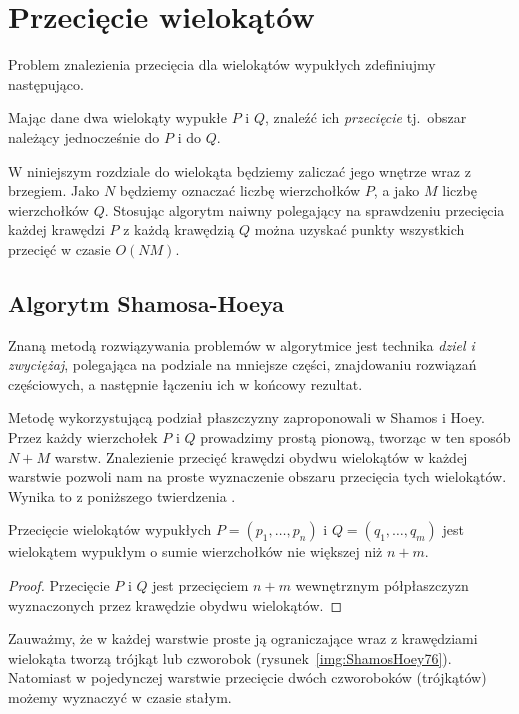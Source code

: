 \chapter{Przecięcie wielokątów}
Problem znalezienia przecięcia dla wielokątów wypukłych zdefiniujmy
następująco.

\begin{problem}
  Mając dane dwa wielokąty wypukłe $P$ i $Q$, znaleźć ich
  \emph{przecięcie} tj.\ obszar należący jednocześnie do $P$ i do $Q$.
\end{problem}

W niniejszym rozdziale do wielokąta będziemy zaliczać jego wnętrze
wraz z brzegiem. Jako $N$ będziemy oznaczać liczbę wierzchołków $P$, a
jako $M$ liczbę wierzchołków $Q$. Stosując algorytm naiwny polegający
na sprawdzeniu przecięcia każdej krawędzi $P$ z każdą krawędzią $Q$
można uzyskać punkty wszystkich przecięć w czasie $O(NM)$.

\section{Algorytm Shamosa-Hoeya}
Znaną metodą rozwiązywania problemów w algorytmice jest technika
\emph{dziel i zwyciężaj}, polegająca na podziale na mniejsze części,
znajdowaniu rozwiązań częściowych, a następnie łączeniu ich w końcowy
rezultat.

Metodę wykorzystującą podział płaszczyzny zaproponowali w
\cite{ShamosHoey76} Shamos i Hoey. Przez każdy wierzchołek $P$ i $Q$
prowadzimy prostą pionową, tworząc w ten sposób $N+M$
warstw. Znalezienie przecięć krawędzi obydwu wielokątów w każdej
warstwie pozwoli nam na proste wyznaczenie obszaru przecięcia tych
wielokątów. Wynika to z poniższego twierdzenia \cite{ShamosHoey76}.

\begin{twierdzenie}
  Przecięcie wielokątów wypukłych $P = (p_1, \ldots, p_n)$ i $Q =
  (q_1, \ldots, q_m)$ jest wielokątem wypukłym o sumie wierzchołków
  nie większej niż $n + m$.
\end{twierdzenie}

\begin{proof}
  Przecięcie $P$ i $Q$ jest przecięciem $n + m$ wewnętrznym
  półpłaszczyzn wyznaczonych przez krawędzie obydwu wielokątów.
\end{proof}

Zauważmy, że w każdej warstwie proste ją ograniczające wraz z
krawędziami wielokąta tworzą trójkąt lub czworobok
(rysunek~\ref{img:ShamosHoey76}). Natomiast w pojedynczej warstwie
przecięcie dwóch czworoboków (trójkątów) możemy wyznaczyć w czasie
stałym.

